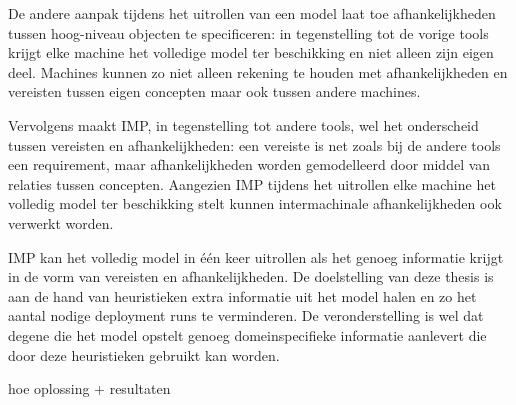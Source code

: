 De andere aanpak tijdens het uitrollen van een model laat toe afhankelijkheden tussen hoog-niveau objecten te specificeren:
in tegenstelling tot de vorige tools krijgt elke machine het volledige model ter beschikking en niet alleen zijn eigen deel.
Machines kunnen zo niet alleen rekening te houden met afhankelijkheden en vereisten tussen eigen concepten maar ook tussen andere machines.

Vervolgens maakt IMP, in tegenstelling tot andere tools, wel het onderscheid tussen vereisten en afhankelijkheden:
een vereiste is net zoals bij de andere tools een requirement, maar afhankelijkheden worden gemodelleerd door middel van relaties tussen concepten.
Aangezien IMP tijdens het uitrollen elke machine het volledig model ter beschikking stelt kunnen intermachinale afhankelijkheden ook verwerkt worden.

IMP kan het volledig model in \'e\'en keer uitrollen als het genoeg informatie krijgt in de vorm van vereisten en afhankelijkheden.
De doelstelling van deze thesis is aan de hand van heuristieken extra informatie uit het model halen en zo het aantal nodige deployment runs te verminderen.
De veronderstelling is wel dat degene die het model opstelt genoeg domeinspecifieke informatie aanlevert die door deze heuristieken gebruikt kan worden.

 hoe oplossing + resultaten
